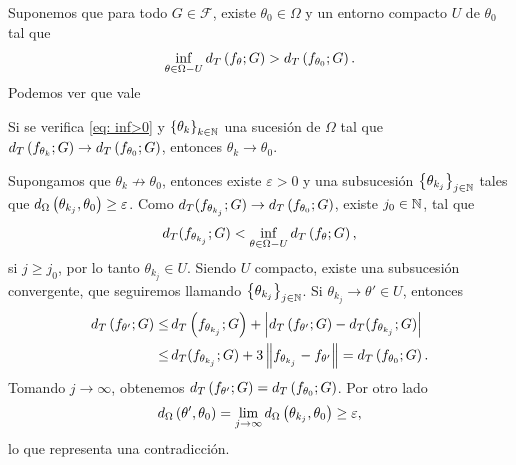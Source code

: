 Suponemos que 
para todo $G\in\mathcal{F}$, existe $\theta_{0}\in\Omega$ y un entorno compacto $U$ de $\theta_{0}$ tal que
\begin{align}
\label{eq: inf>0}
\inf_{\theta\in \Omega-U}d_{T}\left( f_{\theta};G \right)>d_{T}\left( f_{\theta_{0}};G \right).
\end{align}
Podemos ver que vale
\begin{proposition}
	\label{pr: convergencia}
	Si se verifica \eqref{eq: inf>0} y $\left\{ \theta_{k} \right\}_{k\in\mathbb{N}}$ una sucesión de $\Omega$ tal que 
	$d_{T}\left( f_{\theta_{k}};G \right)\to d_{T}\left( f_{\theta_{0}};G \right)$, entonces $\theta_{k}\to\theta_{0}$.
\end{proposition}
\begin{dem}
	Supongamos que $\theta_{k}\not\to\theta_{0}$, entonces existe $\varepsilon>0$ y una subsucesión 
	$\left\{ \theta_{k_{j}} \right\}_{j\in\mathbb{N}}$ tales que $d_{\Omega}\left( \theta_{k_{j}},\theta_{0} \right)\ge\varepsilon$.
	Como $d_{T}(f_{\theta_{k_{j}}};G)\to d_{T}\left( f_{\theta_{0}};G \right)$, existe $j_{0}\in\mathbb{N}$, tal que 
	\begin{align*}
	d_{T}(f_{\theta_{k_{j}}};G) < \inf_{\theta\in \Omega-U}d_{T}\left( f_{\theta};G \right),
	\end{align*}
	si $j\ge j_{0}$, por lo tanto $\theta_{k_{j}}\in U$. Siendo $U$ compacto, existe una subsucesión convergente,
	que seguiremos llamando $\left\{ \theta_{k_{j}} \right\}_{j\in\mathbb{N}}$.
	Si $\theta_{k_{j}}\to\theta'\in U$, entonces
	\begin{align*}
	d_{T}\left( f_{\theta'};G \right) \le &\, d_{T}\left( f_{\theta_{k_{j}}};G \right)
	+ \left| d_{T}\left( f_{\theta'};G \right) - d_{T}(f_{\theta_{k_{j}}};G) \right| \\
	\le &\, d_{T}(f_{\theta_{k_{j}}};G) + 3 \left\| f_{\theta_{k_{j}}} - f_{\theta'} \right\|
	= d_{T}\left( f_{\theta_{0}};G \right).
	\end{align*}
	Tomando $j\to\infty$, obtenemos $d_{T}\left( f_{\theta'};G \right) = d_{T}\left( f_{\theta_{0}};G \right)$. 
	Por otro lado
	\begin{align*}
	d_{\Omega}\left( \theta',\theta_{0} \right) = \lim_{j\to\infty}d_{\Omega}\left( \theta_{k_{j}},\theta_{0} \right)\ge\varepsilon,
	\end{align*}
	lo que representa una contradicción.
\end{dem}